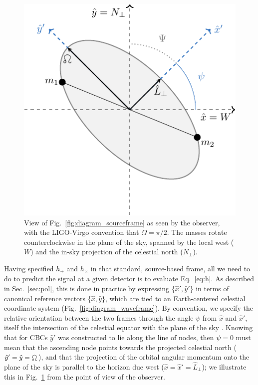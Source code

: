\documentclass[aps,prd,twocolumn,superscriptaddress,preprintnumbers,floatfix,nofootinbib]{revtex4-2}
\newcommand*{\eq}[1]{Eq.~\eqref{eq:#1}}
\begin{document}
\begin{figure}
\includegraphics[width=0.8\columnwidth]{diagram_skyview.pdf}
\caption{View of Fig.~\ref{fig:diagram_sourceframe} as seen by the observer, with the LIGO-Virgo convention that $\Omega=\pi/2$. The masses rotate counterclockwise in the plane of the sky, spanned by the local west ($W$) and the in-sky projection of the celestial north ($N_\perp$).
}
\label{fig:diagram_skyview}
\end{figure}

Having specified $h_+$ and $h_\times$ in that standard, source-based frame, all we need to do to predict the signal at a given detector is to evaluate \eq{h}.
As described in Sec.~\ref{sec:pol}, this is done in practice by expressing $\{\hat{x}', \hat{y}'\}$ in terms of canonical reference vectors $\{\hat{x},\hat{y}\}$, which are tied to an Earth-centered celestial coordinate system (Fig.~\ref{fig:diagram_waveframe}).
By convention, we specify the relative orientation between the two frames through the angle $\psi$ from $\hat{x}$ and $\hat{x}'$, itself the intersection of the celestial equator with the plane of the sky \cite{LALSuite:wave}.
Knowing that for CBCs $\hat{y}'$ was constructed to lie along the line of nodes, then $\psi = 0$ must mean that the ascending node points towards the projected celestial north ($\hat{y}'=\hat{y}=\ascnode$), and that the projection of the orbital angular momentum onto the plane of the sky is parallel to the horizon due west ($\hat{x}=\hat{x}'=\hat{L}_\perp$); we illustrate this in Fig.~\ref{fig:diagram_skyview} from the point of view of the observer.
\end{document}
